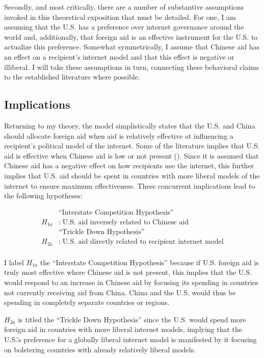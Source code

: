 Secondly, and most critically, there are a number of substantive assumptions invoked in this theoretical exposition that must be detailed. For one, I am assuming that the U.S. has a preference over internet governance around the world and, additionally, that foreign aid is an effective instrument for the U.S. to actualize this preference. Somewhat symmetrically, I assume that Chinese aid has an effect on a recipient's internet model and that this effect is negative or illiberal. I will take these assumptions in turn, connecting these behavioral claims to the established literature where possible.

\subsection*{Implications}
Returning to my theory, the model simplistically states that the U.S. and China should allocate foreign aid when aid is relatively effective at influencing a recipient's political model of the internet. Some of the literature implies that U.S. aid is effective when Chinese aid is low or not present (\cite{dreher2021}). Since it is assumed that Chinese aid has a negative effect on how recipients use the internet, this further implies that U.S. aid should be spent in countries with more liberal models of the internet to ensure maximum effectiveness. These concurrent implications lead to the following hypotheses:

\begin{align*}
    &\text{``Interstate Competition Hypothesis''}\\
    H_{1a}&:\;\text{U.S. aid inversely related to Chinese aid}\\
    &\text{``Trickle Down Hypothesis''}\\
    H_{2a}&:\;\text{U.S. aid directly related to recipient internet model}\\
\end{align*}

I label $H_{1a}$ the ``Interstate Competition Hypothesis'' because if U.S. foreign aid is truly most effective where Chinese aid is not present, this implies that the U.S. would respond to an increase in Chinese aid by focusing its spending in countries not currently receiving aid from China. China and the U.S. would thus be spending in completely separate countries or regions.

$H_{2a}$ is titled the ``Trickle Down Hypothesis'' since the U.S. would spend more foreign aid in countries with more liberal internet models, implying that the U.S.'s preference for a globally liberal internet model is manifested by it focusing on bolstering countries with already relatively liberal models.

